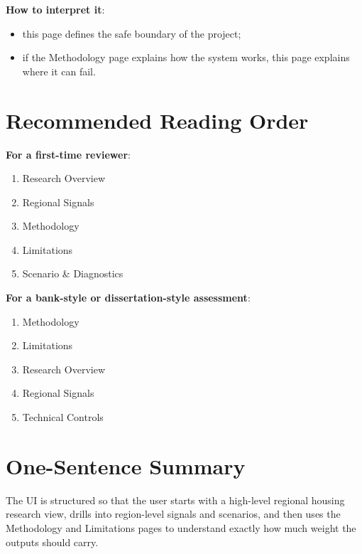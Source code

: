 \documentclass[11pt,a4paper]{article}
\begin{document}
\textbf{How to interpret it}:
\begin{itemize}[leftmargin=1.5em]
  \item this page defines the safe boundary of the project;
  \item if the Methodology page explains how the system works, this page explains where it can fail.
\end{itemize}

\section{Recommended Reading Order}

\textbf{For a first-time reviewer}:
\begin{enumerate}[leftmargin=1.5em]
  \item Research Overview
  \item Regional Signals
  \item Methodology
  \item Limitations
  \item Scenario \& Diagnostics
\end{enumerate}

\textbf{For a bank-style or dissertation-style assessment}:
\begin{enumerate}[leftmargin=1.5em]
  \item Methodology
  \item Limitations
  \item Research Overview
  \item Regional Signals
  \item Technical Controls
\end{enumerate}

\section{One-Sentence Summary}

The UI is structured so that the user starts with a high-level regional housing
research view, drills into region-level signals and scenarios, and then uses
the Methodology and Limitations pages to understand exactly how much weight the
outputs should carry.
\end{document}
